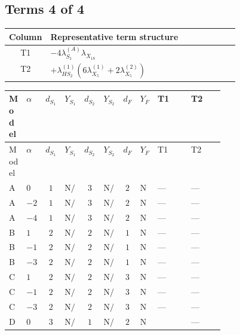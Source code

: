 \documentclass[8pt]{article}
\begin{document}
\begin{landscape}
\subsection*{Terms 4 of 4}
\begin{center}
\begin{tabular}{@{}c >{\raggedright\arraybackslash}p{0.82\linewidth}@{}}
\toprule
Column & Representative term structure \\
\midrule
T1 & \(\displaystyle -4 {\lambda_{S_1}^{(A)}} {\lambda_{X_{18}}}\) \\
\midrule
T2 & \(\displaystyle +{\lambda_{HS_2}^{(1)}} (6 {\lambda_{X_{5}}^{(1)}}+2 {\lambda_{X_{5}}^{(2)}})\) \\
\midrule
\bottomrule
\end{tabular}
\end{center}
\smallskip
\tiny
\begin{longtable}{@{}llcccccc >{\raggedright\arraybackslash}p{0.21\linewidth} >{\raggedright\arraybackslash}p{0.21\linewidth}@{}}
\toprule
Model & $\alpha$ & $d_{S_1}$ & $Y_{S_1}$ & $d_{S_2}$ & $Y_{S_2}$ & $d_F$ & $Y_F$ & T1 & T2 \\
\midrule
\endfirsthead
\toprule
Model & $\alpha$ & $d_{S_1}$ & $Y_{S_1}$ & $d_{S_2}$ & $Y_{S_2}$ & $d_F$ & $Y_F$ & T1 & T2 \\
\midrule
\endhead
A & $0$ & $1$ & $\text{N/A}$ & $3$ & $\text{N/A}$ & $2$ & $\text{N/A}$ & --- & --- \\
\midrule
A & $-2$ & $1$ & $\text{N/A}$ & $3$ & $\text{N/A}$ & $2$ & $\text{N/A}$ & --- & --- \\
\midrule
A & $-4$ & $1$ & $\text{N/A}$ & $3$ & $\text{N/A}$ & $2$ & $\text{N/A}$ & --- & --- \\
\midrule
B & $1$ & $2$ & $\text{N/A}$ & $2$ & $\text{N/A}$ & $1$ & $\text{N/A}$ & --- & --- \\
\midrule
B & $-1$ & $2$ & $\text{N/A}$ & $2$ & $\text{N/A}$ & $1$ & $\text{N/A}$ & --- & --- \\
\midrule
B & $-3$ & $2$ & $\text{N/A}$ & $2$ & $\text{N/A}$ & $1$ & $\text{N/A}$ & --- & --- \\
\midrule
C & $1$ & $2$ & $\text{N/A}$ & $2$ & $\text{N/A}$ & $3$ & $\text{N/A}$ & --- & --- \\
\midrule
C & $-1$ & $2$ & $\text{N/A}$ & $2$ & $\text{N/A}$ & $3$ & $\text{N/A}$ & --- & --- \\
\midrule
C & $-3$ & $2$ & $\text{N/A}$ & $2$ & $\text{N/A}$ & $3$ & $\text{N/A}$ & --- & --- \\
\midrule
D & $0$ & $3$ & $\text{N/A}$ & $1$ & $\text{N/A}$ & $2$ & $\text{N/A}$ & \scriptsize\adjustbox{max width=\linewidth}{$\begin{gathered} -4 {\lambda_{S_1}^{(A)}} {\lambda_{X_{18}}}\end{gathered}$} & --- \\

\end{longtable}
\end{landscape}
\end{document}
